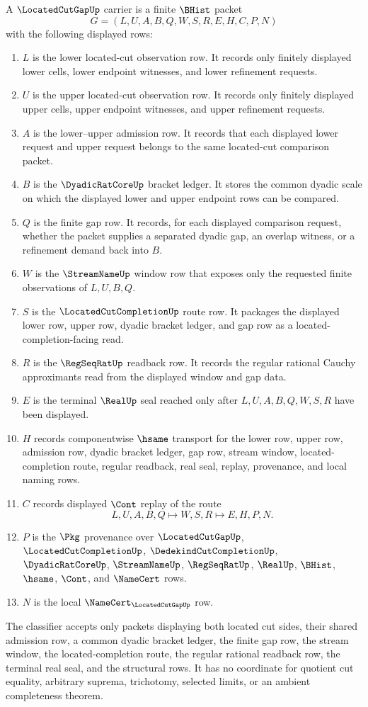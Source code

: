\begin{definition}\label{def:located-cut-gap-carrier}
A $\LocatedCutGapUp$ carrier is a finite $\BHist$ packet
$$
G=(L,U,A,B,Q,W,S,R,E,H,C,P,N)
$$
with the following displayed rows:
\begin{enumerate}
\item $L$ is the lower located-cut observation row. It records only finitely displayed lower cells, lower endpoint witnesses, and lower refinement requests.
\item $U$ is the upper located-cut observation row. It records only finitely displayed upper cells, upper endpoint witnesses, and upper refinement requests.
\item $A$ is the lower--upper admission row. It records that each displayed lower request and upper request belongs to the same located-cut comparison packet.
\item $B$ is the $\DyadicRatCoreUp$ bracket ledger. It stores the common dyadic scale on which the displayed lower and upper endpoint rows can be compared.
\item $Q$ is the finite gap row. It records, for each displayed comparison request, whether the packet supplies a separated dyadic gap, an overlap witness, or a refinement demand back into $B$.
\item $W$ is the $\StreamNameUp$ window row that exposes only the requested finite observations of $L,U,B,Q$.
\item $S$ is the $\LocatedCutCompletionUp$ route row. It packages the displayed lower row, upper row, dyadic bracket ledger, and gap row as a located-completion-facing read.
\item $R$ is the $\RegSeqRatUp$ readback row. It records the regular rational Cauchy approximants read from the displayed window and gap data.
\item $E$ is the terminal $\RealUp$ seal reached only after $L,U,A,B,Q,W,S,R$ have been displayed.
\item $H$ records componentwise $\hsame$ transport for the lower row, upper row, admission row, dyadic bracket ledger, gap row, stream window, located-completion route, regular readback, real seal, replay, provenance, and local naming rows.
\item $C$ records displayed $\Cont$ replay of the route
$$
L,U,A,B,Q \longmapsto W,S,R \longmapsto E,H,P,N .
$$
\item $P$ is the $\Pkg$ provenance over $\LocatedCutGapUp$, $\LocatedCutCompletionUp$, $\DedekindCutCompletionUp$, $\DyadicRatCoreUp$, $\StreamNameUp$, $\RegSeqRatUp$, $\RealUp$, $\BHist$, $\hsame$, $\Cont$, and $\NameCert$ rows.
\item $N$ is the local $\NameCert_{\LocatedCutGapUp}$ row.
\end{enumerate}
The classifier accepts only packets displaying both located cut sides, their shared admission row, a common dyadic bracket ledger, the finite gap row, the stream window, the located-completion route, the regular rational readback row, the terminal real seal, and the structural rows. It has no coordinate for quotient cut equality, arbitrary suprema, trichotomy, selected limits, or an ambient completeness theorem.
\end{definition}

